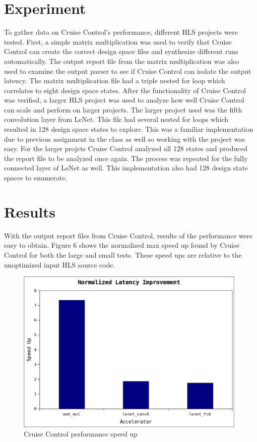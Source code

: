 \documentclass[letterpaper, 10 pt, conference]{IEEEconf}  %
\begin{document}
\section{Experiment}
To gather data on Cruise Control's performance, different HLS projects were tested. First, a simple matrix multiplication was used to verify that Cruise Control can create the correct design space files and synthesize different runs automatically. The output report file from the matrix multiplication was also used to examine the output parser to see if Cruise Control can isolate the output latency. The matrix multiplication file had a triple nested for loop which correlates to eight design space states. \newline 
\indent After the functionality of Cruise Control was verified, a larger HLS project was used to analyze how well Cruise Control can scale and perform on larger projects. The larger project used was the fifth convolution layer from LeNet. This file had several nested for loops which resulted in 128 design space states to explore. This was a familiar implementation due to previous assignment in the class as well so working with the project was easy. For the larger projcts Cruise Control analyzed all 128 states and produced the report file to be analyzed once again. The process was repeated for the fully connected layer of LeNet as well. This implementation also had 128 design state spaces to enumerate.  


\section{Results}
With the output report files from Cruise Control, results of the performance were easy to obtain. Figure 6 shows the normalized max speed up found by Cruise Control for both the large and small tests. These speed ups are relative to the unoptimized input HLS source code.

\begin{figure}[H]
\centering
\includegraphics[scale=.35]{result0.png} 
\caption{Cruise Control performance speed up}
\end{figure}
\end{document}
